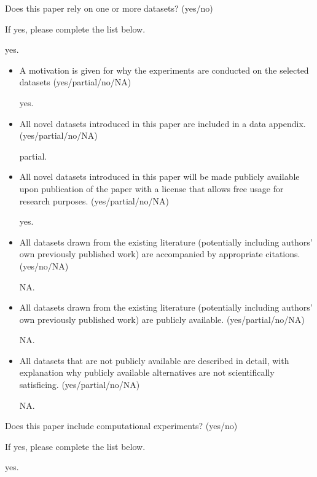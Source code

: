 \noindent Does this paper rely on one or more datasets? (yes/no)

\noindent If yes, please complete the list below.

yes.

\begin{itemize}
\item A motivation is given for why the experiments are conducted on the selected datasets (yes/partial/no/NA)

yes.

\item All novel datasets introduced in this paper are included in a data appendix. (yes/partial/no/NA)

partial.

\item All novel datasets introduced in this paper will be made publicly available upon publication of the paper with a license that allows free usage for research purposes. (yes/partial/no/NA)

yes.

\item All datasets drawn from the existing literature (potentially including authors’ own previously published work) are accompanied by appropriate citations. (yes/no/NA)

NA.

\item All datasets drawn from the existing literature (potentially including authors’ own previously published work) are publicly available. (yes/partial/no/NA)

NA.

\item All datasets that are not publicly available are described in detail, with explanation why publicly available alternatives are not scientifically satisficing. (yes/partial/no/NA)

NA.

\end{itemize}

\noindent Does this paper include computational experiments? (yes/no)

\noindent If yes, please complete the list below.

yes.

